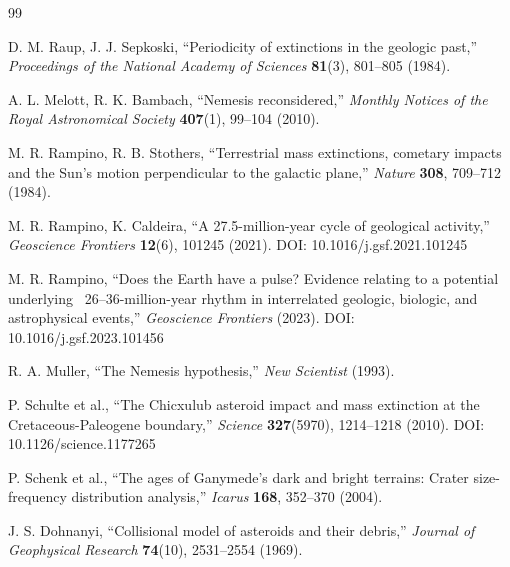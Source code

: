 \documentclass[11pt,a4paper]{article}
\begin{document}
	\begin{thebibliography}{99}
		
		D. M. Raup, J. J. Sepkoski, ``Periodicity of extinctions in the geologic past,''
		\emph{Proceedings of the National Academy of Sciences} \textbf{81}(3), 801–805 (1984).
		
		A. L. Melott, R. K. Bambach, ``Nemesis reconsidered,''
		\emph{Monthly Notices of the Royal Astronomical Society} \textbf{407}(1), 99–104 (2010).
		
		M. R. Rampino, R. B. Stothers, ``Terrestrial mass extinctions, cometary impacts and the Sun's motion perpendicular to the galactic plane,''
		\emph{Nature} \textbf{308}, 709–712 (1984).
		
		M. R. Rampino, K. Caldeira, ``A 27.5-million-year cycle of geological activity,''
		\emph{Geoscience Frontiers} \textbf{12}(6), 101245 (2021). DOI: 10.1016/j.gsf.2021.101245
		
		M. R. Rampino, ``Does the Earth have a pulse? Evidence relating to a potential underlying ~26–36-million-year rhythm in interrelated geologic, biologic, and astrophysical events,''
		\emph{Geoscience Frontiers} (2023). DOI: 10.1016/j.gsf.2023.101456
		
		R. A. Muller, ``The Nemesis hypothesis,''
		\emph{New Scientist} (1993).
		
		P. Schulte et al., ``The Chicxulub asteroid impact and mass extinction at the Cretaceous-Paleogene boundary,''
		\emph{Science} \textbf{327}(5970), 1214–1218 (2010). DOI: 10.1126/science.1177265
		
		P. Schenk et al., ``The ages of Ganymede's dark and bright terrains: Crater size-frequency distribution analysis,''
		\emph{Icarus} \textbf{168}, 352–370 (2004).
		
		J. S. Dohnanyi, ``Collisional model of asteroids and their debris,''
		\emph{Journal of Geophysical Research} \textbf{74}(10), 2531–2554 (1969).
		

\end{thebibliography}
\end{document}
